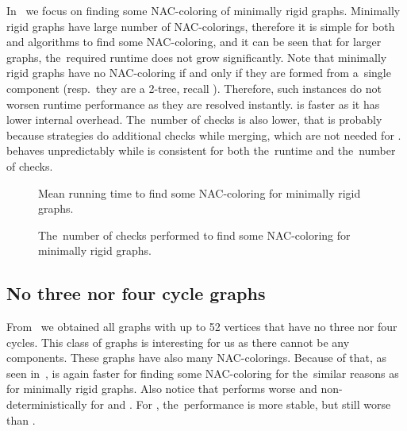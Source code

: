 In~
we focus on finding some NAC-coloring of minimally rigid graphs.
%
Minimally rigid graphs have large number of NAC-colorings,
therefore it is simple for both \NaiveCycles{}
and \Subgraphs{} algorithms to find some NAC-coloring,
and it can be seen that for larger graphs, the~required runtime
does not grow significantly.
%
Note that minimally rigid graphs have no NAC-coloring if and only if they are formed from
a~single \trcon{} component (resp.\ they are a 2-tree, recall ).
Therefore, such instances do not worsen runtime performance as they are resolved instantly.
%
\NaiveCycles{} is faster as it has lower internal overhead.
The~number of \IsNACColoring{} checks is also lower,
that is probably because \Subgraphs{} strategies do additional checks
while merging, which are not needed for \NaiveCycles{}.
\SharedVertices{} behaves unpredictably while \MergeLinear{} is consistent
for both the~runtime and the~number of \IsNACColoring{} checks.

\begin{figure}[thbp]
	\centering
	\scalebox{\BenchFigureScale}{}
	\caption[Mean runtime for minimally rigid graphs (some)]{
		Mean running time to find some NAC-coloring for minimally rigid graphs.}%
	\label{fig:graph_minimally_rigid_first_runtime}
\end{figure}%
\begin{figure}[thbp]
	\centering
	\scalebox{\BenchFigureScale}{}
	\caption[Checks performed for minimally rigid graphs (some)]{
		The~number of checks performed to find some NAC-coloring for minimally rigid graphs.}%
	\label{fig:graph_minimally_rigid_first_checks}
\end{figure}%



\subsection*{No three nor four cycle graphs}

From~\cite{extremal_graphs} we obtained all graphs with up to 52 vertices
that have no three nor four cycles. This class of graphs is interesting for us
as there cannot be any \trcon{} components.
These graphs have also many NAC-colorings.
Because of that, as seen in~,
\NaiveCycles{} is again faster for finding some NAC-coloring
for the~similar reasons as for minimally rigid graphs.
%
Also notice that \SharedVertices{} performs worse and non-deterministically
for \CyclesMatchChunks{} and \None{}.
For \Neighbors{}, the~performance is more stable, but still worse than \MergeLinear{}.

